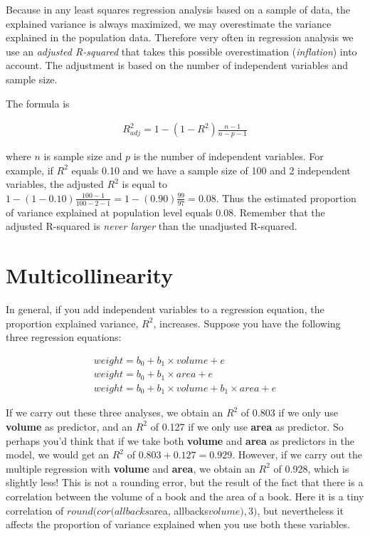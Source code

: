 \documentclass[]{report}\usepackage[]{graphicx}\usepackage[]{color}
\begin{document}
Because in any least squares regression analysis based on a sample of data, the explained variance is always maximized, we may overestimate the variance explained in the population data. Therefore very often in regression analysis we use an \textit{adjusted R-squared} that takes this possible overestimation (\textit{inflation}) into account. The adjustment is based on the number of independent variables and sample size.

The formula is


\begin{eqnarray}
R^2_{adj}= 1 - (1-R^2)\frac{n-1}{n-p-1} \nonumber
\end{eqnarray}

where $n$ is sample size and $p$ is the number of independent variables. For example, if $R^2$ equals 0.10 and we have a sample size of 100 and 2 independent variables, the adjusted $R^2$ is equal to $1 - (1-0.10)\frac{100-1}{100-2-1}= 1 - (0.90)\frac{99}{97}=0.08$. Thus the estimated proportion of variance explained at population level equals 0.08. Remember that the adjusted R-squared is \textit{never larger} than the unadjusted R-squared.




\section{Multicollinearity}

In general, if you add independent variables to a regression equation, the proportion explained variance, $R^2$, increases. Suppose you have the following three regression equations:

\begin{eqnarray}
weight = b_0 + b_1 \times  volume + e \\
weight = b_0 + b_1 \times  area + e \\
weight = b_0 + b_1 \times  volume + b_1 \times  area + e
\end{eqnarray}

If we carry out these three analyses, we obtain an $R^2$ of 0.803 if we only use \textbf{volume} as predictor, and an $R^2$ of 0.127 if we only use \textbf{area} as predictor. So perhaps you'd think that if we take both \textbf{volume} and \textbf{area} as predictors in the model, we would get an $R^2$ of $0.803+0.127= 0.929$. However, if we carry out the multiple regression with \textbf{volume} and \textbf{area}, we obtain an $R^2$ of 0.928, which is slightly less! This is not a rounding error, but the result of the fact that there is a correlation between the volume of a book and the area of a book. Here it is a tiny correlation of $round(cor(allbacks$area, allbacks$volume),3)$, but nevertheless it affects the proportion of variance explained when you use both these variables.
\end{document}
